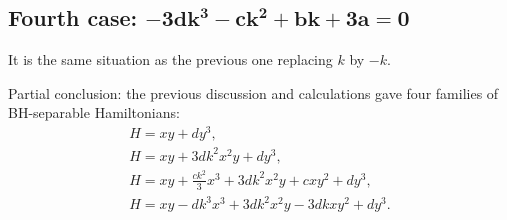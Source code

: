\documentclass[10pt,a4paper]{amsart}
\numberwithin{equation}{section}
\begin{document}
\subsection*{Fourth case: $\boldsymbol{-3dk^3-ck^2+bk+3a=0}$}

It is the same situation as the previous one replacing $k$ by $-k$.

Partial conclusion: the previous discussion and calculations gave four families of BH-separable Hamiltonians:
\begin{gather*}
H=xy+dy^3,
\\
H=xy+3dk^2x^2y+dy^3,
\\
H=xy+\frac{ck^2}{3}x^3+3dk^2x^2y+cxy^2+dy^3,
\\
H=xy-dk^3x^3+3dk^2x^2y-3dkxy^2+dy^3.
\end{gather*}
\end{document}
